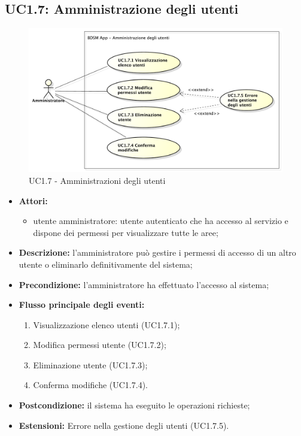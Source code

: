 \subsection{UC1.7: Amministrazione degli utenti}
\begin{figure}[!htbp]
	\centering
	\centerline{\includegraphics[scale=0.45]{./images/UC1_7.pdf}}
	\caption{UC1.7 - Amministrazioni degli utenti}
\end{figure}

\begin{itemize}
	\item \textbf{Attori:}
	\begin{itemize}
		\item utente amministratore: utente autenticato che ha accesso al servizio e dispone dei permessi per visualizzare tutte le aree;
	\end{itemize}
	\item \textbf{Descrizione:} l'amministratore può gestire i permessi di accesso di un altro utente o eliminarlo definitivamente del sistema;
	\item \textbf{Precondizione:} l'amministratore ha effettuato l'accesso al sistema;
	\item \textbf{Flusso principale degli eventi:}
	\begin{enumerate}
		\item Visualizzazione elenco utenti (UC1.7.1);
		\item Modifica permessi utente (UC1.7.2);
		\item Eliminazione utente (UC1.7.3);
		\item Conferma modifiche (UC1.7.4).
	\end{enumerate}
	\item \textbf{Postcondizione:} il sistema ha eseguito le operazioni richieste;
	\item \textbf{Estensioni:} Errore nella gestione degli utenti (UC1.7.5).
\end{itemize}

